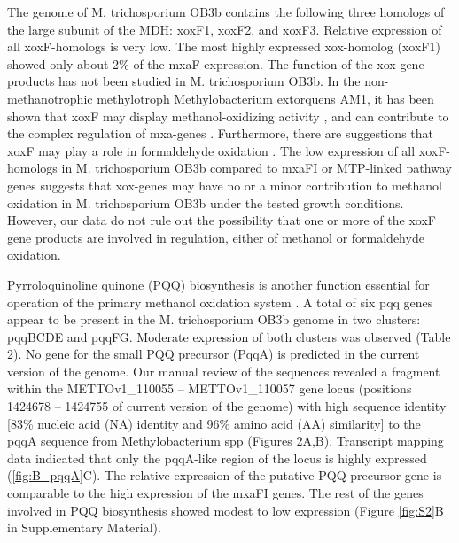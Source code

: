 The genome of M. trichosporium OB3b contains the following three homologs of the large subunit of the MDH: xoxF1, xoxF2, and xoxF3.
Relative expression of all xoxF-homologs is very low.
The most highly expressed xox-homolog (xoxF1) showed only about 2\% of the mxaF expression.
The function of the xox-gene products has not been studied in M. trichosporium OB3b.
In the non-methanotrophic methylotroph Methylobacterium extorquens AM1, it has been shown that xoxF may display methanol-oxidizing activity \cite{schmidt2010}, and can contribute to the complex regulation of mxa-genes \cite{skovran2011}.
Furthermore, there are suggestions that xoxF may play a role in formaldehyde oxidation \cite{wilson2008}.
The low expression of all xoxF-homologs in M. trichosporium OB3b compared to mxaFI or MTP-linked pathway genes suggests that xox-genes may have no or a minor contribution to methanol oxidation in M. trichosporium OB3b under the tested growth conditions.
However, our data do not rule out the possibility that one or more of the xoxF gene products are involved in regulation, either of methanol or formaldehyde oxidation.

Pyrroloquinoline quinone (PQQ) biosynthesis is another function essential for operation of the primary methanol oxidation system \cite{toyama1997, anthony2002}.
A total of six pqq genes appear to be present in the M. trichosporium OB3b genome in two clusters: pqqBCDE and pqqFG.
Moderate expression of both clusters was observed (Table 2).
No gene for the small PQQ precursor (PqqA) is predicted in the current version of the genome.
Our manual review of the sequences revealed a fragment within the METTOv1\_110055 – METTOv1\_110057 gene locus (positions 1424678 – 1424755 of current version of the genome) with high sequence identity [83\% nucleic acid (NA) identity and 96\% amino acid (AA) similarity] to the pqqA sequence from Methylobacterium spp (Figures 2A,B).
Transcript mapping data indicated that only the pqqA-like region of the locus is highly expressed (\ref{fig:B_pqqA}C).
The relative expression of the putative PQQ precursor gene is comparable to the high expression of the mxaFI genes.
The rest of the genes involved in PQQ biosynthesis showed modest to low expression (Figure \ref{fig:S2}B in Supplementary Material).

